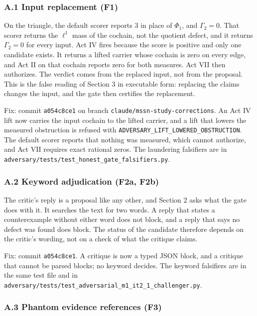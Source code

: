 \documentclass[
  11pt,
]{article}
\newcommand{\passthrough}[1]{#1}
\begin{document}
\subsubsection{A.1 Input replacement
(F1)}\label{a.1-input-replacement-f1}

On the triangle, the default scorer reports 3 in place of \(\Phi_1\),
and \(\Gamma_2 = 0\). That scorer returns the \(\ell^1\) mass of the
cochain, not the quotient defect, and it returns \(\Gamma_2 = 0\) for
every input. Act IV fires because the score is positive and only one
candidate exists. It returns a lifted carrier whose cochain is zero on
every edge, and Act II on that cochain reports zero for both measures.
Act VII then authorizes. The verdict comes from the replaced input, not
from the proposal. This is the false reading of Section 3 in executable
form: replacing the claims changes the input, and the gate then
certifies the replacement.

Fix: commit \passthrough{\lstinline!a054c8ce1!} on branch
\nolinkurl{claude/mssn-study-corrections}. An Act IV lift now carries
the input cochain to the lifted carrier, and a lift that lowers the
measured obstruction is refused with
\nolinkurl{ADVERSARY_LIFT_LOWERED_OBSTRUCTION}. The default scorer reports
that nothing was measured, which cannot authorize, and Act VII requires
exact rational zeros. The laundering falsifiers are in
\nolinkurl{adversary/tests/test_honest_gate_falsifiers.py}.

\subsubsection{A.2 Keyword adjudication (F2a,
F2b)}\label{a.2-keyword-adjudication-f2a-f2b}

The critic's reply is a proposal like any other, and Section 2 asks what
the gate does with it. It searches the text for two words. A reply that
states a counterexample without either word does not block, and a reply
that says no defect was found does block. The status of the candidate
therefore depends on the critic's wording, not on a check of what the
critique claims.

Fix: commit \passthrough{\lstinline!a054c8ce1!}. A critique is now a
typed JSON block, and a critique that cannot be parsed blocks; no
keyword decides. The keyword falsifiers are in the same test file and in
\nolinkurl{adversary/tests/test_adversarial_m1_it2_1_challenger.py}.

\subsubsection{A.3 Phantom evidence references
(F3)}\label{a.3-phantom-evidence-references-f3}
\end{document}
